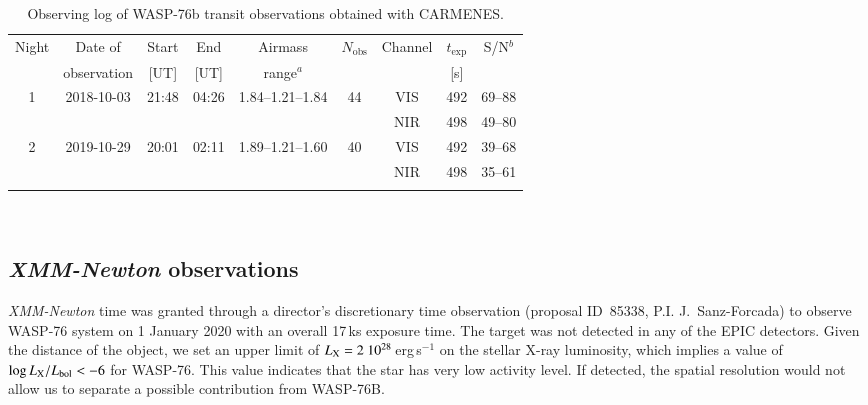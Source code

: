 \documentclass{aa}
\begin{document}
\begin{table*}[]
\centering
\caption{Observing log of WASP-76b transit observations obtained with CARMENES.}
\begin{tabular}{ccccccccc}
\hline
\hline
\noalign{\smallskip}
Night & Date of   & Start & End &  Airmass & $N_\mathrm{obs}$ & Channel & $t_\mathrm{exp}$  & S/N$^b$ \\
         & observation & [UT] & [UT] & range$^a$ & & & [s] &   \\
\noalign{\smallskip}
\hline
\noalign{\smallskip}
1 & 2018-10-03 & 21:48 & 04:26 & 1.84--1.21--1.84 & 44 & VIS & 492 & 69--88 \\
 & & & & & & NIR & 498 & 49--80 \\
2 & 2019-10-29 & 20:01 &  02:11 & 1.89--1.21--1.60 & 40 & VIS & 492 & 39--68 \\ 
 & & & & & & NIR & 498 & 35--61 \\
\noalign{\smallskip}
\hline
\end{tabular}\\
\label{Tab:Obs}
\end{table*}


\subsection{{\it XMM-Newton} observations}

{\em XMM-Newton} time was granted through a director's discretionary time observation (proposal ID~85338, P.I. J.~Sanz-Forcada) to observe WASP-76 system on 1 January 2020 with an overall 17\,ks exposure time. 
The target was not detected in any of the EPIC detectors. 
Given the distance of the object, we set an upper limit of $L_{\rm X}=2 ~ 10^{28}$\,erg\,s$^{-1}$ on the stellar X-ray luminosity, which implies a value of $\log L_{\rm X}/L_{\rm bol}<-6$ for
WASP-76.
This value indicates that the star has very low activity level. 
If detected, the spatial resolution would not allow us to separate a possible contribution from WASP-76B.
\end{document}
